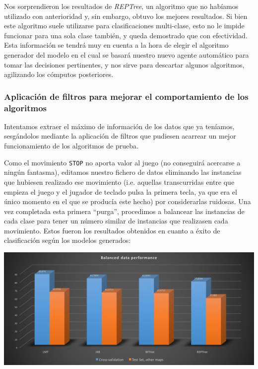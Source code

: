 \documentclass[12pt]{article}
\begin{document}
\vspace{0.2cm}

Nos sorprendieron los resultados de \emph{REPTree}, un algoritmo que no habíamos utilizado con anterioridad y, sin embargo, obtuvo los mejores resultados. Si bien este algoritmo suele utilizarse para clasificaciones multi-clase, esto no le impide funcionar para una sola clase también, y queda demostrado que con efectividad. Esta información se tendrá muy en cuenta a la hora de elegir el algoritmo generador del modelo en el cual se basará nuestro nuevo agente automático para tomar las decisiones pertinentes, y nos sirve para descartar algunos algoritmos, agilizando los cómputos posteriores.

\subsubsection{Aplicación de filtros para mejorar el comportamiento de los algoritmos}

Intentamos extraer el máximo de información de los datos que ya teníamos, sesgándolos mediante la aplicación de filtros que pudiesen acarrear un mejor funcionamiento de los algoritmos de prueba.

Como el movimiento \texttt{STOP} no aporta valor al juego (no conseguirá acercarse a ningún fantasma), editamos nuestro fichero de datos eliminando las instancias que hubiesen realizado ese movimiento (i.e. aquellas transcurridas entre que empieza el juego y el jugador de teclado pulsa la primera tecla, ya que era el único momento en el que se producía este hecho) por considerarlas ruidosas. Una vez completada esta primera ``purga'', procedimos a balancear las instancias de cada clase para tener un número similar de instancias que realizasen cada movimiento. Estos fueron los resultados obtenidos en cuanto a éxito de clasificación según los modelos generados:

\newpage
\noindent \includegraphics[width=\textwidth]{balanced_performance}
\end{document}
